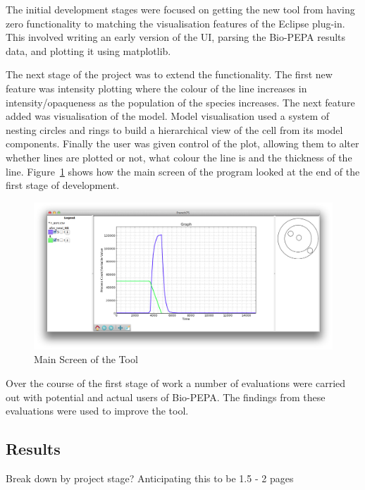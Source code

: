 The initial development stages were focused on getting the new tool from having zero functionality to matching the visualisation features of the Eclipse plug-in.  This involved writing an early version of the \ac{UI}, parsing the Bio-PEPA results data, and plotting it using matplotlib.

The next stage of the project was to extend the functionality.  The first new feature was intensity plotting where the colour of the line increases in intensity/opaqueness as the population of the species increases.  The next feature added was visualisation of the model.  Model visualisation used a system of nesting circles and rings to build a hierarchical view of the cell from its model components.  Finally the user was given control of the plot, allowing them to alter whether lines are plotted or not, what colour the line is and the thickness of the line.  Figure~\ref{fig:f75_mac_intro} shows how the main screen of the program looked at the end of the first stage of development.

\begin{figure}[h!]
    \centering
    \includegraphics[width=\textwidth]{images/french75_mac.png}
    \caption{Main Screen of the Tool}
    \label{fig:f75_mac_intro}
\end{figure}

Over the course of the first stage of work a number of evaluations were carried out with potential and actual users of Bio-PEPA.  The findings from these evaluations were used to improve the tool.

\subsection{Results}

Break down by project stage?  Anticipating this to be 1.5 - 2 pages

